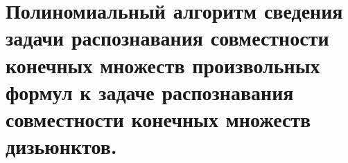 \section{Полиномиальный алгоритм сведения задачи распознавания совместности конечных множеств произвольных формул к задаче распознавания совместности конечных множеств дизьюнктов.}